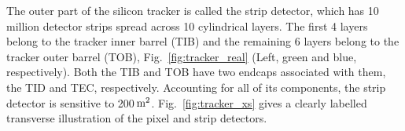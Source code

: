 The outer part of the silicon tracker is called the strip detector, which has 10 million detector strips spread across 10 cylindrical layers.
The first 4 layers belong to the tracker inner barrel (TIB) and the remaining 6 layers belong to the tracker outer barrel (TOB), Fig.~\ref{fig:tracker_real} (Left, green and blue, respectively). 
Both the TIB and TOB have two endcaps associated with them, the TID and TEC, respectively.
Accounting for all of its components, the strip detector is sensitive to 200$\meter^2$.
Fig.~\ref{fig:tracker_xs} gives a clearly labelled transverse illustration of the pixel and strip detectors.
